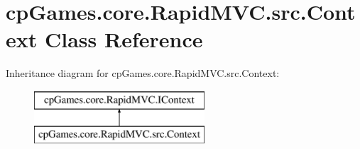 \hypertarget{classcp_games_1_1core_1_1_rapid_m_v_c_1_1src_1_1_context}{}\section{cp\+Games.\+core.\+Rapid\+M\+V\+C.\+src.\+Context Class Reference}
\label{classcp_games_1_1core_1_1_rapid_m_v_c_1_1src_1_1_context}
Inheritance diagram for cp\+Games.\+core.\+Rapid\+M\+V\+C.\+src.\+Context\+:\begin{figure}[H]
\begin{center}
\leavevmode
\includegraphics[height=2.000000cm]{classcp_games_1_1core_1_1_rapid_m_v_c_1_1src_1_1_context}
\end{center}
\end{figure}
